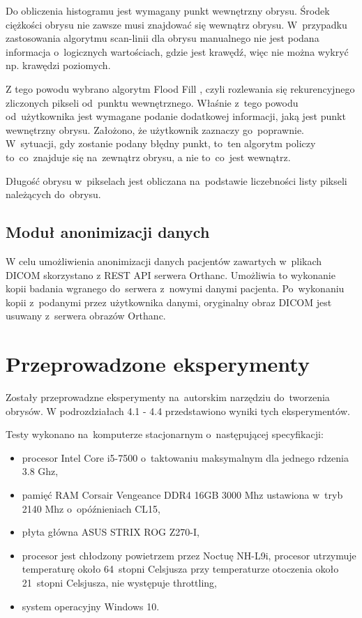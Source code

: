 \documentclass[a4paper,11pt,twoside,openright]{report}
\newcommand\blankpage{%
    \null
    \thispagestyle{empty}%
    \newpage}
\theoremstyle{definition}
\begin{document}
Do obliczenia histogramu jest wymagany punkt wewnętrzny obrysu. Środek ciężkości
obrysu nie zawsze musi znajdować się wewnątrz obrysu. W~przypadku zastosowania
algorytmu scan-linii dla obrysu manualnego nie jest podana informacja o~logicznych
wartościach, gdzie jest krawędź, więc nie można wykryć np. krawędzi poziomych.

Z tego powodu wybrano algorytm Flood Fill \cite{AiSD2}, czyli rozlewania się rekurencyjnego %
zliczonych pikseli od~punktu wewnętrznego. Właśnie z~tego powodu od~użytkownika
jest wymagane podanie dodatkowej informacji, jaką jest punkt wewnętrzny obrysu.
Założono, że użytkownik zaznaczy go~poprawnie. W~sytuacji, gdy zostanie podany
błędny punkt, to~ten algorytm policzy to~co~znajduje się na~zewnątrz obrysu, a
nie to~co~jest wewnątrz.

Długość obrysu w~pikselach jest obliczana na~podstawie liczebności listy pikseli należących do~obrysu.

\section {Moduł anonimizacji danych}

W celu umożliwienia anonimizacji danych pacjentów zawartych w~plikach DICOM skorzystano
z REST API serwera Orthanc. Umożliwia to wykonanie kopii badania wgranego do~serwera
z~nowymi danymi pacjenta. Po~wykonaniu kopii z~podanymi przez użytkownika danymi,
oryginalny obraz DICOM jest usuwany z~serwera obrazów Orthanc.



\chapter {Przeprowadzone eksperymenty}

Zostały przeprowadzne eksperymenty na~autorskim narzędziu do~tworzenia obrysów.
W podrozdziałach 4.1 - 4.4 przedstawiono wyniki tych eksperymentów.

Testy wykonano na~komputerze stacjonarnym o~następującej specyfikacji:
\begin{itemize}[noitemsep]
\item procesor Intel Core i5-7500 o~taktowaniu maksymalnym dla jednego rdzenia 3.8 Ghz,
\item pamięć RAM Corsair Vengeance DDR4 16GB 3000 Mhz ustawiona w~tryb 2140 Mhz o~opóźnieniach CL15,
\item płyta główna ASUS STRIX ROG Z270-I,
\item procesor jest chłodzony powietrzem przez Noctuę NH-L9i, procesor utrzymuje
temperaturę około 64~stopni Celsjusza przy temperaturze otoczenia około 21~stopni
Celsjusza, nie występuje throttling,
\item system operacyjny Windows 10.
\end{itemize}
\end{document}
